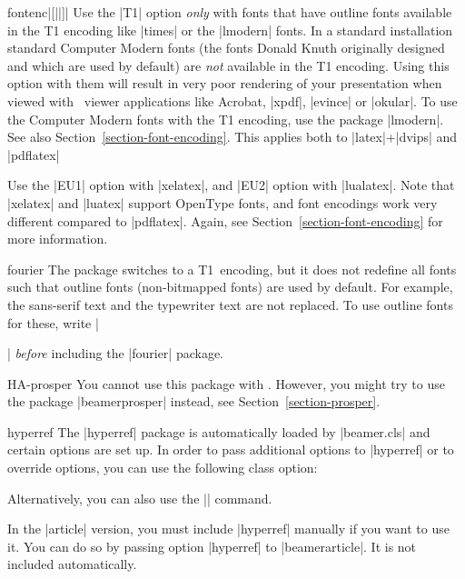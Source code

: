 \begin{package}{{fontenc}|[||]|}
  Use the |T1| option \emph{only} with fonts that have outline fonts available in the T1 encoding like |times| or the |lmodern| fonts. In a standard installation standard Computer Modern fonts (the fonts Donald Knuth originally designed and which are used by default) are \emph{not} available in the T1 encoding. Using this option with them will result in very poor rendering of your presentation when viewed with \pdf\ viewer applications like Acrobat, |xpdf|, |evince| or |okular|. To use the Computer Modern fonts with the T1 encoding, use the package |lmodern|. See also Section~\ref{section-font-encoding}. This applies both to |latex|+|dvips| and |pdflatex|

  Use the |EU1| option with |xelatex|, and |EU2| option with |lualatex|. Note that |xelatex| and |luatex| support OpenType fonts, and font encodings work very different compared to |pdflatex|. Again, see Section~\ref{section-font-encoding} for more information.
\end{package}

\begin{package}{{fourier}}
  The package switches to a T1~encoding, but it does not redefine all fonts such that outline fonts (non-bitmapped fonts) are used by default. For example, the sans-serif text and the typewriter text are not replaced. To use outline fonts for these, write |\usepackage{lmodern}| \emph{before} including the |fourier| package.
\end{package}

\begin{package}{{HA-prosper}}
  You cannot use this package with \beamer. However, you might try to use the package |beamerprosper| instead, see Section~\ref{section-prosper}.
\end{package}

\begin{package}{{hyperref}}
  \beamernote
  The |hyperref| package is automatically loaded by |beamer.cls| and certain options are set up. In order to pass additional options to |hyperref| or to override options, you can use the following class option:


  Alternatively, you can also use the |\hypersetup| command.

  \articlenote
  In the |article| version, you must include |hyperref| manually if you want to use it. You can do so by passing option |hyperref| to |beamerarticle|. It is not included automatically.
\end{package}

